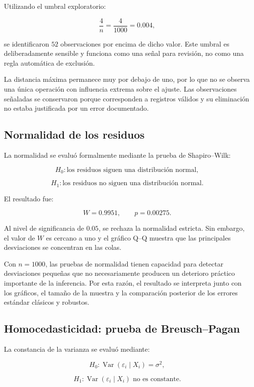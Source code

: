 Utilizando el umbral exploratorio:

\[
\frac{4}{n}
=
\frac{4}{1000}
=
0.004,
\]

se identificaron \(52\) observaciones por encima de dicho valor. Este
umbral es deliberadamente sensible y funciona como una señal para
revisión, no como una regla automática de exclusión.

La distancia máxima permanece muy por debajo de uno, por lo que no se
observa una única operación con influencia extrema sobre el ajuste.
Las observaciones señaladas se conservaron porque corresponden a
registros válidos y su eliminación no estaba justificada por un error
documentado.

\subsection{Normalidad de los residuos}

La normalidad se evaluó formalmente mediante la prueba de Shapiro--Wilk:

\[
H_0:
\text{los residuos siguen una distribución normal},
\]

\[
H_1:
\text{los residuos no siguen una distribución normal}.
\]

El resultado fue:

\[
W=\num{0.9951},
\qquad
p=\num{0.00275}.
\]

Al nivel de significancia de \(0.05\), se rechaza la normalidad estricta.
Sin embargo, el valor de \(W\) es cercano a uno y el gráfico Q--Q muestra
que las principales desviaciones se concentran en las colas.

Con \(n=1000\), las pruebas de normalidad tienen capacidad para detectar
desviaciones pequeñas que no necesariamente producen un deterioro
práctico importante de la inferencia. Por esta razón, el resultado se
interpreta junto con los gráficos, el tamaño de la muestra y la
comparación posterior de los errores estándar clásicos y robustos.

\subsection{Homocedasticidad: prueba de Breusch--Pagan}

La constancia de la varianza se evaluó mediante:

\[
H_0:
\operatorname{Var}(\varepsilon_i\mid X_i)=\sigma^2,
\]

\[
H_1:
\operatorname{Var}(\varepsilon_i\mid X_i)
\text{ no es constante}.
\]


